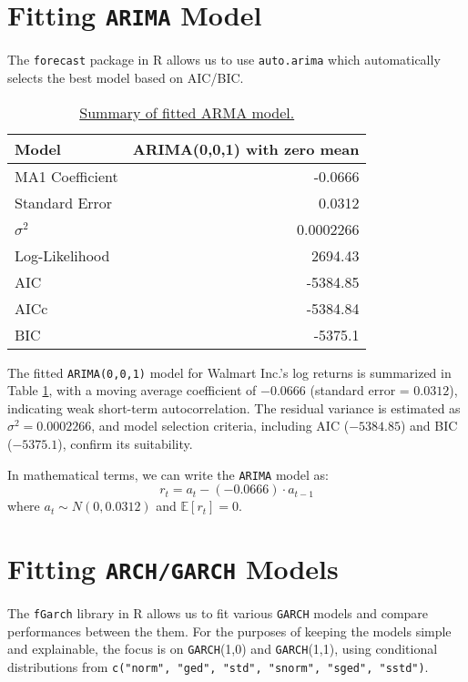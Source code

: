 \documentclass{article}
\newcommand{\1}{\mathbbm{1}}
\theoremstyle{definition}
\begin{document}
\section{Fitting \texttt{ARIMA} Model}

The \texttt{forecast} package in R allows us to use \texttt{auto.arima} which automatically selects the best model based on AIC/BIC.

\begin{table}[H]
\centering
\begin{tabular}{l|r}
\hline
\textbf{Model}  & \textbf{ARIMA(0,0,1) with zero mean} \\
\hline
MA1 Coefficient & -0.0666 \\
Standard Error  & 0.0312 \\
$\sigma^2$      & 0.0002266 \\
\hline
Log-Likelihood  & 2694.43 \\
AIC             & -5384.85 \\
AICc            & -5384.84 \\
BIC             & -5375.1 \\
\hline
\end{tabular}
\caption{\small{\href{https://github.com/Stochastic1017/Walmart-Stock-Forecasting/blob/main/R/Fit_ARMA.R}{Summary of fitted ARMA model.}}}
\label{tab:arma_model_summary}
\end{table}

The fitted \texttt{ARIMA(0,0,1)} model for Walmart Inc.'s log returns is summarized in Table \ref{tab:arma_model_summary}, with a moving average coefficient of $-0.0666$ (standard error = $0.0312$), indicating weak short-term autocorrelation. The residual variance is estimated as $\sigma^2 = 0.0002266$, and model selection criteria, including AIC ($-5384.85$) and BIC ($-5375.1$), confirm its suitability.

In mathematical terms, we can write the \texttt{ARIMA} model as:
$$r_t = a_t - (-0.0666) \cdot a_{t-1}$$
where $a_t \sim N(0, 0.0312)$ and $\mathbb{E}[r_t] = 0$.


\section{Fitting \texttt{ARCH/GARCH} Models}

The \texttt{fGarch} library in R allows us to fit various \texttt{GARCH} models and compare performances between the them. For the purposes of keeping the models simple and explainable, the focus is on \texttt{GARCH}(1,0) and \texttt{GARCH}(1,1), using conditional distributions from \texttt{c("norm", "ged", "std", "snorm", "sged", "sstd")}.
\end{document}
